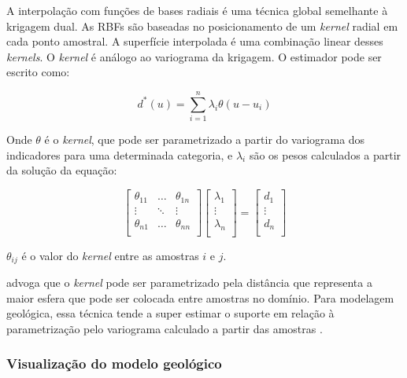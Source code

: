 
A interpolação com funções de bases radiais \cite{fasshauer2007meshfree} é uma técnica global semelhante à krigagem dual. As RBFs são baseadas no posicionamento de um \textit{kernel} radial em cada ponto amostral. A superfície interpolada é uma combinação linear desses \textit{kernels}. O \textit{kernel} é análogo ao variograma da krigagem. O estimador pode ser escrito como:

\begin{equation}
\label{estimador}
d^*(u)=\sum_{i=1}^{n} \lambda_i \theta(u - u_i)
\end{equation}

Onde $\theta$ é o \textit{kernel}, que pode ser parametrizado a partir do variograma dos indicadores para uma determinada categoria, e $\lambda_i$ são os pesos calculados a partir da solução da equação:

\begin{equation}
    \label{rbf_sist}
    \begin{bmatrix} 
    \theta_{11}&\dots&\theta_{1n}\\
    \vdots&\ddots&\vdots\\
    \theta_{n1}&\dots&\theta_{nn}\\ 
    \end{bmatrix}
    \begin{bmatrix} 
    \lambda_{1}\\
    \vdots\\
    \lambda_{n}\\ 
    \end{bmatrix}
    =
    \begin{bmatrix} 
    d_{1}\\
    \vdots\\
    d_{n}\\ 
    \end{bmatrix}
\end{equation}

$\theta_{ij}$ é o valor do \textit{kernel} entre as amostras $i$ e $j$.

 advoga que o \textit{kernel} pode ser parametrizado pela distância que representa a maior esfera que pode ser colocada entre amostras no domínio. Para modelagem geológica, essa técnica tende a super estimar o suporte em relação à parametrização pelo variograma calculado a partir das amostras \cite{martin2017implicitmodeling}.

\subsubsection{Visualização do modelo geológico}

